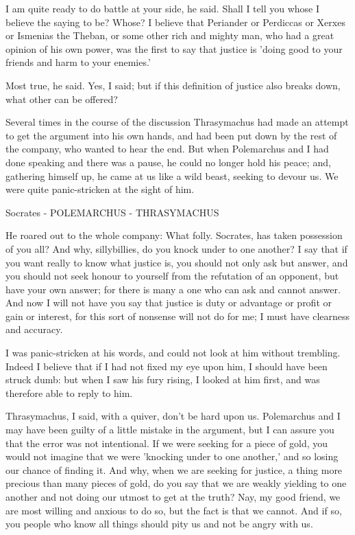 I am quite ready to do battle at your side, he said.
Shall I tell you whose I believe the saying to be?
Whose?
I believe that Periander or Perdiccas or Xerxes or Ismenias the Theban, or some other rich and mighty man, who had a great opinion of his own power, was the first to say that justice is 'doing good to your friends and harm to your enemies.'

Most true, he said.
Yes, I said; but if this definition of justice also breaks down, what other can be offered?

Several times in the course of the discussion Thrasymachus had made an attempt to get the argument into his own hands, and had been put down by the rest of the company, who wanted to hear the end. But when Polemarchus and I had done speaking and there was a pause, he could no longer hold his peace; and, gathering himself up, he came at us like a wild beast, seeking to devour us. We were quite panic-stricken at the sight of him.

Socrates - POLEMARCHUS - THRASYMACHUS

He roared out to the whole company: What folly. Socrates, has taken possession of you all? And why, sillybillies, do you knock under to one another? I say that if you want really to know what justice is, you should not only ask but answer, and you should not seek honour to yourself from the refutation of an opponent, but have your own answer; for there is many a one who can ask and cannot answer. And now I will not have you say that justice is duty or advantage or profit or gain or interest, for this sort of nonsense will not do for me; I must have clearness and accuracy.

I was panic-stricken at his words, and could not look at him without trembling. Indeed I believe that if I had not fixed my eye upon him, I should have been struck dumb: but when I saw his fury rising, I looked at him first, and was therefore able to reply to him.

Thrasymachus, I said, with a quiver, don't be hard upon us. Polemarchus and I may have been guilty of a little mistake in the argument, but I can assure you that the error was not intentional. If we were seeking for a piece of gold, you would not imagine that we were 'knocking under to one another,' and so losing our chance of finding it. And why, when we are seeking for justice, a thing more precious than many pieces of gold, do you say that we are weakly yielding to one another and not doing our utmost to get at the truth? Nay, my good friend, we are most willing and anxious to do so, but the fact is that we cannot. And if so, you people who know all things should pity us and not be angry with us.

